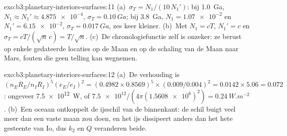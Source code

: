 \begin{solution}{exo:b3:planetary-interiors-surfaces:11}
(a)~$\sigma_T = N_1/(10\,N_1')$: bij \qty{1.0}{Ga}, $N_1 \approx N_1' \approx
\num{4.875e-4}$, $\sigma_T = \qty{0.10}{Ga}$; bij \qty{3.8}{Ga}, $N_1 =
\num{1.07e-2}$ en $N_1' = \num{6.15e-2}$, $\sigma_T = \qty{0.017}{Ga}$,
zes keer kleiner. (b)~Met $N_1 = cT$, $N_1' = c$ en $\sigma_T =
cT/(\sqrt n\,c) = T/\sqrt n$. (c)~De chronologiefunctie zelf is
onzeker: ze berust op enkele gedateerde locaties op de Maan en op de schaling
van de Maan naar Mars, fouten die geen telling kan wegnemen.
\end{solution}

\begin{solution}{exo:b3:planetary-interiors-surfaces:12}
(a)~De verhouding is $(n_ER_E/n_IR_I)^5(e_E/e_I)^2 = (0.4982\times0.8569)^5
\times(0.009/0.004)^2 = 0.0142\times5.06 = 0.072$: ongeveer
\qty{7.5e12}{W}, of $\num{7.5e12}/(4\pi(\num{1.5608e6})^2) =
\qty{0.24}{W.m^{-2}}$. (b)~Een oceaan ontkoppelt de ijsschil van de
binnenkant: de schil buigt veel meer dan een vaste maan zou doen, en het ijs
dissipeert anders dan het hete gesteente van Io, dus $k_2$ en $Q$ veranderen beide.
\end{solution}


